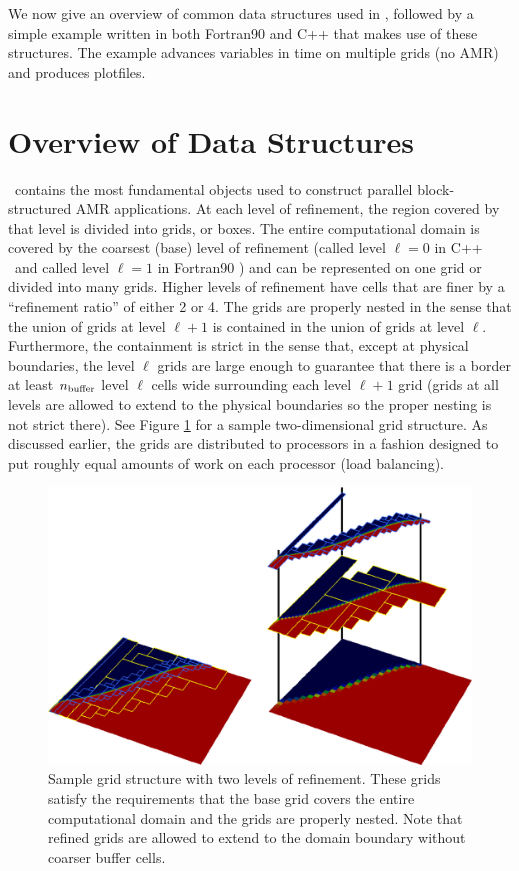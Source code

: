 We now give an overview of common data structures used in \BoxLib, followed by a simple
example written in both Fortran90 and C++ that makes use of these structures.
The example advances variables in time on multiple grids (no AMR) and produces plotfiles.

\section{Overview of Data Structures}

\BoxLib\ contains the most fundamental objects used to construct parallel
block-structured AMR applications.
At each level of refinement, the region covered by that level is divided
into grids, or boxes.  The entire computational domain is covered by
the coarsest (base) level of refinement (called level $\ell=0$ in C++ \BoxLib\ 
and called level $\ell=1$ in Fortran90 \BoxLib) and can be represented on one
grid or divided into many grids.
Higher levels of refinement have cells that are finer by a ``refinement ratio''
of either 2 or 4.  The grids are properly nested in the sense that the union 
of grids at level $\ell+1$ is contained in the union of grids at level $\ell$.
Furthermore, the containment is strict in the sense that, except at physical 
boundaries, the level $\ell$ grids are large enough to guarantee that there is
a border at least $n_{\rm buffer}$ level $\ell$ cells wide surrounding each level
$\ell +1$ grid (grids at all levels are allowed to extend to the physical
boundaries so the proper nesting is not strict there).  See Figure \ref{fig:AMR}
for a sample two-dimensional grid structure.
As discussed earlier, the grids are distributed to processors in
a fashion designed to put roughly equal amounts of work on each
processor (load balancing).
\begin{figure}[tb]
\centering
\includegraphics[width=6.5in]{./Introduction/AMR}
\caption{\label{fig:AMR}Sample grid structure with two levels of refinement.  These
grids satisfy the requirements that the base grid covers the entire computational domain 
and the grids are properly nested.  Note that refined grids are allowed to extend to the
domain boundary without coarser buffer cells.}
\end{figure}

